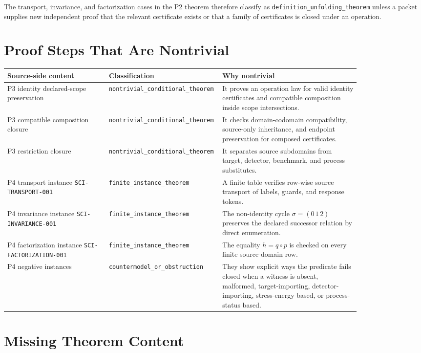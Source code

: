\documentclass[11pt]{article}
\begin{document}
The transport, invariance, and factorization cases in the P2 theorem therefore
classify as \texttt{definition\_unfolding\_theorem} unless a packet supplies
new independent proof that the relevant certificate exists or that a family of
certificates is closed under an operation.

\section{Proof Steps That Are Nontrivial}

\begin{longtable}{p{0.28\linewidth}p{0.18\linewidth}p{0.38\linewidth}}
\toprule
Source-side content & Classification & Why nontrivial \\
\midrule
P3 identity declared-scope preservation &
\texttt{nontrivial\_conditional\_theorem} &
It proves an operation law for valid identity certificates and compatible
composition inside scope intersections. \\
P3 compatible composition closure &
\texttt{nontrivial\_conditional\_theorem} &
It checks domain-codomain compatibility, source-only inheritance, and endpoint
preservation for composed certificates. \\
P3 restriction closure & \texttt{nontrivial\_conditional\_theorem} &
It separates source subdomains from target, detector, benchmark, and process
substitutes. \\
P4 transport instance \texttt{SCI-TRANSPORT-001} &
\texttt{finite\_instance\_theorem} &
A finite table verifies row-wise source transport of labels, guards, and
response tokens. \\
P4 invariance instance \texttt{SCI-INVARIANCE-001} &
\texttt{finite\_instance\_theorem} &
The non-identity cycle \(\sigma=(0\,1\,2)\) preserves the declared successor
relation by direct enumeration. \\
P4 factorization instance \texttt{SCI-FACTORIZATION-001} &
\texttt{finite\_instance\_theorem} &
The equality \(h=q\circ p\) is checked on every finite source-domain row. \\
P4 negative instances & \texttt{countermodel\_or\_obstruction} &
They show explicit ways the predicate fails closed when a witness is absent,
malformed, target-importing, detector-importing, stress-energy based, or
process-status based. \\
\bottomrule
\end{longtable}

\section{Missing Theorem Content}
\end{document}
